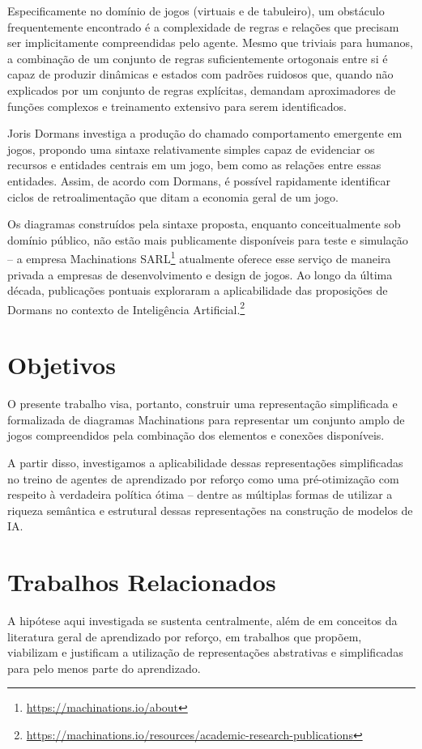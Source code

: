 \documentclass[conference]{IEEEtran}
\begin{document}
Especificamente no domínio de jogos (virtuais e de tabuleiro), um obstáculo frequentemente encontrado é a complexidade de regras e relações que precisam ser implicitamente compreendidas pelo agente. Mesmo que triviais para humanos, a combinação de um conjunto de regras suficientemente ortogonais entre si é capaz de produzir dinâmicas e estados com padrões ruidosos que, quando não explicados por um conjunto de regras explícitas, demandam aproximadores de funções complexos e treinamento extensivo para serem identificados.

Joris Dormans\cite{machinations} investiga a produção do chamado comportamento emergente em jogos, propondo uma sintaxe relativamente simples capaz de evidenciar os recursos e entidades centrais em um jogo, bem como as relações entre essas entidades. Assim, de acordo com Dormans, é possível rapidamente identificar ciclos de retroalimentação que ditam a economia geral de um jogo.

Os diagramas construídos pela sintaxe proposta, enquanto conceitualmente sob domínio público, não estão mais publicamente disponíveis para teste e simulação -- a empresa Machinations SARL\footnote{\url{https://machinations.io/about}} atualmente oferece esse serviço de maneira privada a empresas de desenvolvimento e design de jogos. Ao longo da última década, publicações pontuais exploraram a aplicabilidade das proposições de Dormans no contexto de Inteligência Artificial.\footnote{\url{https://machinations.io/resources/academic-research-publications}}


\section{Objetivos}
\label{goals}

O presente trabalho visa, portanto, construir uma representação simplificada e formalizada de diagramas  Machinations para representar um conjunto amplo de jogos compreendidos pela combinação dos elementos e conexões disponíveis. 

A partir disso, investigamos a aplicabilidade dessas representações simplificadas no treino de agentes de aprendizado por reforço como uma pré-otimização com respeito à verdadeira política ótima -- dentre as múltiplas formas de utilizar a riqueza semântica e estrutural dessas representações na construção de modelos de IA.

\section{Trabalhos Relacionados}
A hipótese aqui investigada se sustenta centralmente, além de em conceitos da literatura geral de aprendizado por reforço, em trabalhos que propõem, viabilizam e justificam a utilização de representações abstrativas e simplificadas para pelo menos parte do aprendizado.
\end{document}

